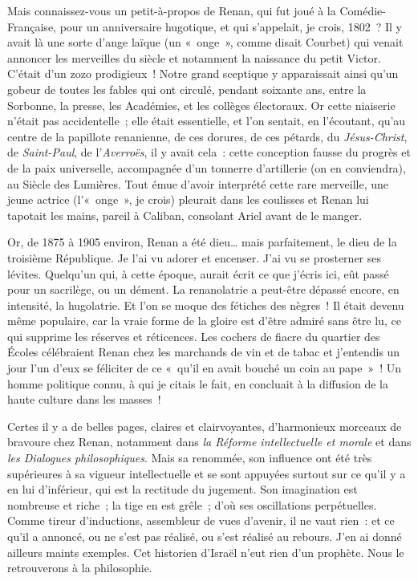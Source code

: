 \documentclass[french,twoside]{book} %
\begin{document}
Mais connaissez-vous un petit-à-propos de Renan, qui fut joué à la Comédie-Française, pour un anniversaire hugotique, et qui s’appelait, je crois, 1802 ? Il y avait là une sorte d’ange laïque (un « onge », comme disait Courbet) qui venait annoncer les merveilles du siècle et notamment la naissance du petit Victor. C’était d’un zozo prodigieux ! Notre grand sceptique y apparaissait ainsi qu’un gobeur de toutes les fables qui ont circulé, pendant soixante ans, entre la Sorbonne, la presse, les Académies, et les collèges électoraux. Or cette niaiserie n’était pas accidentelle ; elle était essentielle, et l’on sentait, en l’écoutant, qu’au centre de la papillote renanienne, de ces dorures, de ces pétards, du {\itshape Jésus-Christ}, de {\itshape Saint-Paul}, de l’{\itshape Averroës}, il y avait cela : cette conception fausse du progrès et de la paix universelle, accompagnée d’un tonnerre d’artillerie (on en conviendra), au Siècle des Lumières. Tout émue d’avoir interprété cette rare merveille, une jeune actrice (l’« onge », je crois) pleurait dans les coulisses et Renan lui tapotait les mains, pareil à Caliban, consolant Ariel avant de le manger.\par
Or, de 1875 à 1905 environ, Renan a été dieu… mais parfaitement, le dieu de la troisième République. Je l’ai vu adorer et encenser. J’ai vu se prosterner ses lévites. Quelqu’un qui, à cette époque, aurait écrit ce que j’écris ici, eût passé pour un sacrilège, ou un dément. La renanolatrie a peut-être dépassé encore, en intensité, la hugolatrie. Et l’on se moque des fétiches des nègres ! Il était devenu même populaire, car la vraie forme de la gloire est d’être admiré sans être lu, ce qui supprime les réserves et réticences. Les cochers de fiacre du quartier des Écoles célébraient Renan chez les marchands de vin et de tabac et j’entendis un jour l’un d’eux se féliciter de ce « qu’il en avait bouché un coin au pape » ! Un homme politique connu, à qui je citais le fait, en concluait à la diffusion de la haute culture dans les masses !\par
Certes il y a de belles pages, claires et clairvoyantes, d’harmonieux morceaux de bravoure chez Renan, notamment dans {\itshape la Réforme intellectuelle et morale} et dans {\itshape les Dialogues philosophiques}. Mais sa renommée, son influence ont été très supérieures à sa vigueur intellectuelle et se sont appuyées surtout sur ce qu’il y a en lui d’inférieur, qui est la rectitude du jugement. Son imagination est nombreuse et riche ; la tige en est grêle ; d’où ses oscillations perpétuelles. Comme tireur d’inductions, assembleur de vues d’avenir, il ne vaut rien : et ce qu’il a annoncé, ou ne s’est pas réalisé, ou s’est réalisé au rebours. J’en ai donné ailleurs maints exemples. Cet historien d’Israël n’eut rien d’un prophète. Nous le retrouverons à la philosophie.\par
\end{document}
